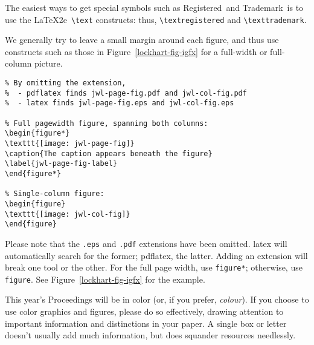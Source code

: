 \documentclass[final]{ols}
\begin{document}
The easiest ways to get special symbols such as
Registered\textregistered\ and Trademark\texttrademark\ 
is to use the \LaTeX2e\ \texttt{{\textbackslash}text} constructs:
thus, \texttt{{\textbackslash}textregistered} and 
\texttt{{\textbackslash}texttrademark}.

We generally try to leave a small margin around each figure, and thus
use constructs such as those in Figure~\ref{lockhart-fig-igfx} for a
full-width or full-column picture. 

\begin{figure*}[htb]
\begin{shaded}
\begin{center}
\begin{small}
\begin{verbatim}
% By omitting the extension,
%  - pdflatex finds jwl-page-fig.pdf and jwl-col-fig.pdf
%  - latex finds jwl-page-fig.eps and jwl-col-fig.eps

% Full pagewidth figure, spanning both columns:
\begin{figure*}
\texttt{[image: jwl-page-fig]}
\caption{The caption appears beneath the figure}
\label{jwl-page-fig-label}
\end{figure*}

% Single-column figure:
\begin{figure}
\texttt{[image: jwl-col-fig]}
\end{figure}
\end{verbatim}
\end{small}
\caption{How to use \texttt{includegraphics}}
\label{lockhart-fig-igfx}
\end{center}
\end{shaded}
\end{figure*}

Please note that the \texttt{.eps} and \texttt{.pdf} extensions have been omitted.
latex will automatically search for the former; pdflatex, the latter.
Adding an extension will break one tool or the other.  For the full
page width, use \texttt{figure*}; otherwise, use \texttt{figure}.  See
Figure~\ref{lockhart-fig-igfx} for the example.

This year's Proceedings will be in color (or, if you prefer, 
\textit{colour}).  If you choose to use color graphics and figures,
please do so effectively, drawing attention to important information
and distinctions in your paper.  A single box or letter doesn't
usually add much information, but does squander resources needlessly.
\end{document}
